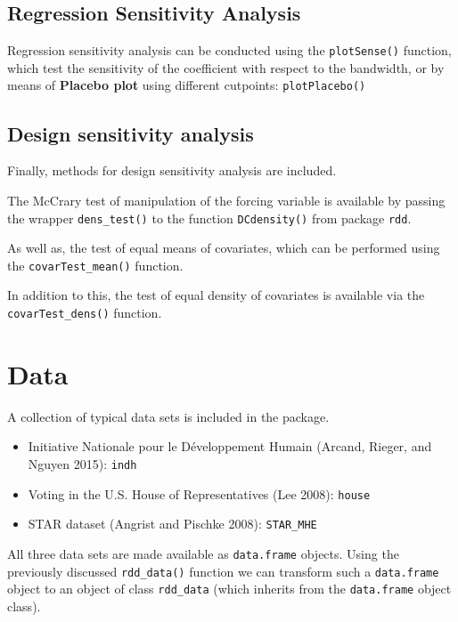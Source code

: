 \documentclass[article]{jss}
\begin{document}
\subsection{Regression Sensitivity
Analysis}\label{regression-sensitivity-analysis}

Regression sensitivity analysis can be conducted using the
\texttt{plotSense()} function, which test the sensitivity of the
coefficient with respect to the bandwidth, or by means of
\textbf{Placebo plot} using different cutpoints: \texttt{plotPlacebo()}

\subsection{Design sensitivity
analysis}\label{design-sensitivity-analysis}

Finally, methods for design sensitivity analysis are included.

The McCrary test of manipulation of the forcing variable is available by
passing the wrapper \texttt{dens\_test()} to the function
\texttt{DCdensity()} from package \texttt{rdd}.

As well as, the test of equal means of covariates, which can be
performed using the \texttt{covarTest\_mean()} function.

In addition to this, the test of equal density of covariates is
available via the \texttt{covarTest\_dens()} function.

\section{Data}\label{data}

A collection of typical data sets is included in the package.

\begin{itemize}
\itemsep1pt\parskip0pt
\item
  Initiative Nationale pour le Développement Humain (Arcand, Rieger, and
  Nguyen 2015): \texttt{indh}
\item
  Voting in the U.S. House of Representatives (Lee 2008): \texttt{house}
\item
  STAR dataset (Angrist and Pischke 2008): \texttt{STAR\_MHE}
\end{itemize}

All three data sets are made available as \texttt{data.frame} objects.
Using the previously discussed \texttt{rdd\_data()} function we can
transform such a \texttt{data.frame} object to an object of class
\texttt{rdd\_data} (which inherits from the \texttt{data.frame} object
class).
\end{document}
